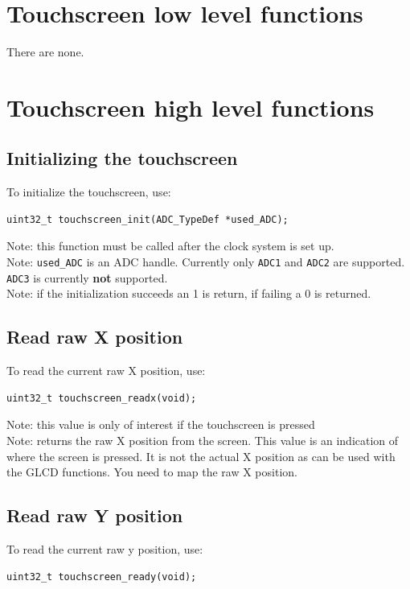 \documentclass[12pt]{article}
\begin{document}
\section{Touchscreen low level functions}
There are none.

\section{Touchscreen high level functions}

\subsection{Initializing the touchscreen}
To initialize the touchscreen, use:

\begin{lstlisting}
uint32_t touchscreen_init(ADC_TypeDef *used_ADC);
\end{lstlisting}

Note: this function must be called after the clock system is set up.\\
Note: \lstinline|used_ADC| is an ADC handle. Currently only \lstinline|ADC1| and \lstinline|ADC2| are supported. \lstinline|ADC3| is currently \textbf{not} supported.\\
Note: if the initialization succeeds an 1 is return, if failing a 0 is returned.

\subsection{Read raw X position}
To read the current raw X position, use:

\begin{lstlisting}
uint32_t touchscreen_readx(void);
\end{lstlisting}

Note: this value is only of interest if the touchscreen is pressed\\
Note: returns the raw X position from the screen. This value is an indication of where the screen is pressed. It is not the actual X position as can be used with the GLCD functions. You need to map the raw X position.

\subsection{Read raw Y position}
To read the current raw y position, use:

\begin{lstlisting}
uint32_t touchscreen_ready(void);
\end{lstlisting}
\end{document}
